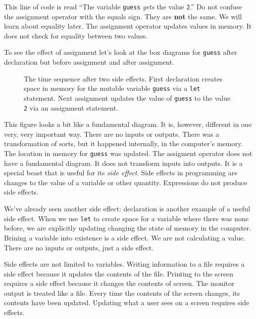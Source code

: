 This line of code is read ``The variable \texttt{guess} \emph{gets} the value \texttt{2}.''  Do not confuse the assignment operator with the equals sign. They are \textbf{not} the same. We will learn about equality later. The assignment operator updates values in memory. It does not check for equality between two values.

To see the effect of assignment let's look at the box diagrams for \texttt{guess} after declaration but before assignment and after assignment.

\begin{figure}
  
  \caption{\label{fig:intro-variable-assignment} The time sequence after two side effects. First declaration creates space in memory for the mutable variable \texttt{guess} via a \texttt{let} statement. Next assignment updates the value of \texttt{guess} to the value \texttt{2} via an assignment statement.}
\end{figure}

This figure looks a bit like a fundamental diagram. It is, however, different in one very, very important way. There are no inputs or outputs. There was a transformation of sorts, but it happened internally, in the computer's memory. The location in memory for \texttt{guess} was updated. The assigment operator does not have a fundamental diagram. It does not transform inputs into outputs. It is a special beast that is useful for its \emph{side effect}. Side effects in programming are changes to the value of a variable or other quantity. Expressions do not produce side effects.

We've already seen another side effect: declaration is another example of a useful side effect. When we use \texttt{let} to create space for a variable where there was none before, we are explicitly updating changing the state of memory in the computer. Brining a variable into existence is a side effect. We are not calculating a value. There are no inputs or outputs, just a side effect.

Side effects are not limited to variables. Writing information to a file requires a side effect because it updates the contents of the file. Printing to the screen requires a side effect because it changes the contents of screen. The monitor output is treated like a file. Every time the contents of the screen changes, its contents have been updated. Updating what a user sees on a screen requires side effects.

